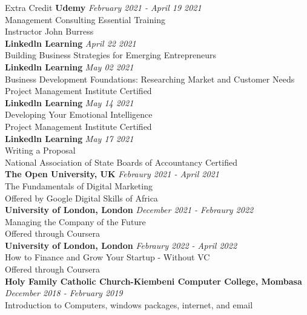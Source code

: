 \documentclass[
	11pt, %
]{resume} %
\begin{document}
\begin{rSection}{Extra Credit}
	\textbf{Udemy} \hfill \textit{February 2021 - April 19 2021} \\
	Management Consulting Essential Training \\
	Instructor John Burress \\
	\textbf{Linkedln Learning} \hfill \textit{April 22 2021} \\
	Building Business Strategies for Emerging Entrepreneurs \\	
	\textbf{Linkedln Learning} \hfill \textit{May 02 2021} \\
	Business Development Foundations: Researching Market and Customer Needs \\
	Project Management Institute Certified \\	
	\textbf{Linkedln Learning} \hfill \textit{May 14 2021} \\
	Developing Your Emotional Intelligence \\
	Project Management Institute Certified \\
	\textbf{Linkedln Learning} \hfill \textit{May 17 2021} \\
	Writing a Proposal \\
	National Association of State Boards of Accountancy Certified \\
	\textbf{The Open University, UK} \hfill \textit{Febraury 2021 - April 2021} \\ 
	The Fundamentals of Digital Marketing \\
	Offered by Google Digital Skills of Africa \\
	\textbf{University of London, London} \hfill \textit{December 2021 - Febraury 2022} \\ 
	Managing the Company of the Future \\
	Offered through Coursera \\
	\textbf{University of London, London} \hfill \textit{Febraury 2022 - April 2022} \\ 
	How to Finance and Grow Your Startup - Without VC \\
	Offered through Coursera \\
	\textbf{Holy Family Catholic Church-Kiembeni Computer College, Mombasa} \hfill \textit{December 2018 - February 2019} \\ 
	Introduction to Computers, windows packages, internet, and email \\
\end{rSection}
\end{document}
